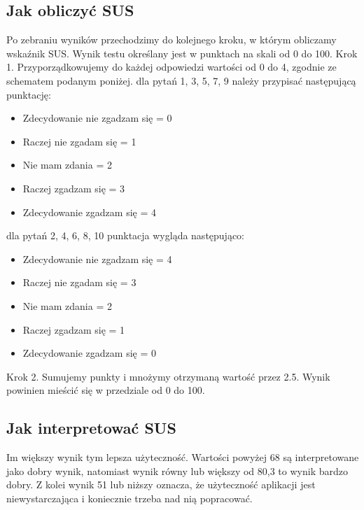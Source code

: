 \subsection{Jak obliczyć SUS}
Po zebraniu wyników przechodzimy do kolejnego kroku, w którym obliczamy wskaźnik SUS\@. Wynik
testu określany jest w punktach na skali od 0 do 100. \newline
Krok 1. Przyporządkowujemy do każdej odpowiedzi wartości od 0 do 4, zgodnie ze schematem podanym
poniżej. \newline
\newline
dla pytań 1, 3, 5, 7, 9 należy przypisać następującą punktację:
\begin{itemize}
    \item Zdecydowanie nie zgadzam się = 0
    \item Raczej nie zgadam się = 1
    \item Nie mam zdania = 2
    \item Raczej zgadzam się = 3
    \item Zdecydowanie zgadzam się = 4
\end{itemize}
dla pytań 2, 4, 6, 8, 10 punktacja wygląda następująco:
\begin{itemize}
    \item Zdecydowanie nie zgadzam się = 4
    \item Raczej nie zgadam się = 3
    \item Nie mam zdania = 2
    \item Raczej zgadzam się = 1
    \item Zdecydowanie zgadzam się = 0
\end{itemize}
Krok 2. Sumujemy punkty i mnożymy otrzymaną wartość przez 2.5.
Wynik powinien mieścić się w przedziale od 0 do 100.
\subsection{Jak interpretować SUS}
Im większy wynik tym lepsza użyteczność. Wartości powyżej 68 są interpretowane jako dobry wynik,
natomiast wynik równy lub większy od 80,3 to wynik bardzo dobry. Z kolei wynik 51 lub niższy oznacza, że
użyteczność aplikacji jest niewystarczająca i koniecznie trzeba nad nią popracować.~\cite{www_SUS}
